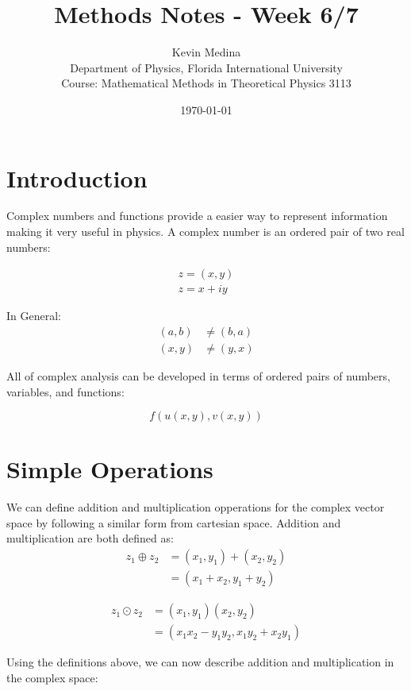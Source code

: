 \documentclass[12pt]{article}
\title{Methods Notes - Week 6/7}
\author{Kevin Medina \\
        Department of Physics, Florida International University \\
        Course: Mathematical Methods in Theoretical Physics 3113}
\date{\today}
\begin{document}
\maketitle

\section{Introduction}
Complex numbers and functions provide a easier way to represent information making it very useful in physics. A complex number is an ordered pair of two real numbers:

\begin{align*}
	z = (x,y) \\
	z = x+iy
\end{align*}



In General:
\begin{align*}
  (a,b) &\neq (b,a) \\
  (x,y) &\neq (y,x)
\end{align*}

All of complex analysis can be developed in terms of ordered pairs of numbers, variables, and functions:

\begin{equation}
	f(u(x,y),v(x,y))
\end{equation}

\section{Simple Operations}
We can define addition and multiplication opperations for the complex vector space by following a similar form from cartesian space. Addition and multiplication are both defined as:
\begin{equation}
\begin{aligned}
	z_1 \oplus z_2 
	&=(x_1,y_1)+ (x_2,y_2) \\
	&=(x_1+x_2,y_1+y_2)
\end{aligned}
\end{equation}

\begin{equation}
\begin{aligned}
	z_1 \odot z_2 
	&=(x_1, y_1)(x_2,y_2) \\
	&=(x_1 x_2 - y_1 y_2, x_1 y_2 + x_2 y_1) 
\end{aligned}
\end{equation}

Using the definitions above, we can now describe addition and multiplication in the complex space:
\end{document}
